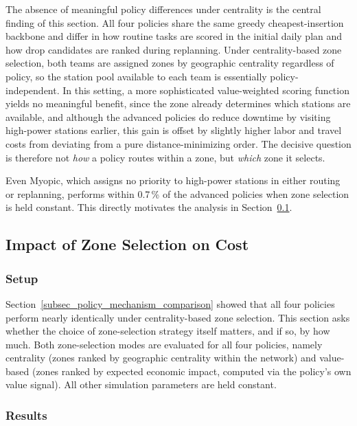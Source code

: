 \documentclass[12pt,oneside]{article}
\begin{document}
The absence of meaningful policy differences under centrality is the central finding of this section. All four policies share the same greedy cheapest-insertion backbone and differ in how routine tasks are scored in the initial daily plan and how drop candidates are ranked during replanning. Under centrality-based zone selection, both teams are assigned zones by geographic centrality regardless of policy, so the station pool available to each team is essentially policy-independent. In this setting, a more sophisticated value-weighted scoring function yields no meaningful benefit, since the zone already determines which stations are available, and although the advanced policies do reduce downtime by visiting high-power stations earlier, this gain is offset by slightly higher labor and travel costs from deviating from a pure distance-minimizing order. The decisive question is therefore not \emph{how} a policy routes within a zone, but \emph{which} zone it selects.

Even Myopic, which assigns no priority to high-power stations in either routing or replanning, performs within 0.7\,\% of the advanced policies when zone selection is held constant. This directly motivates the analysis in Section~\ref{subsec_impact_of_zone_selection_on_cost}.

\subsection{Impact of Zone Selection on Cost}\label{subsec_impact_of_zone_selection_on_cost}

\subsubsection*{Setup}

Section~\ref{subsec_policy_mechanism_comparison} showed that all four policies perform nearly identically under centrality-based zone selection. This section asks whether the choice of zone-selection strategy itself matters, and if so, by how much. Both zone-selection modes are evaluated for all four policies, namely centrality (zones ranked by geographic centrality within the network) and value-based (zones ranked by expected economic impact, computed via the policy's own value signal). All other simulation parameters are held constant.

\subsubsection*{Results}
\end{document}

